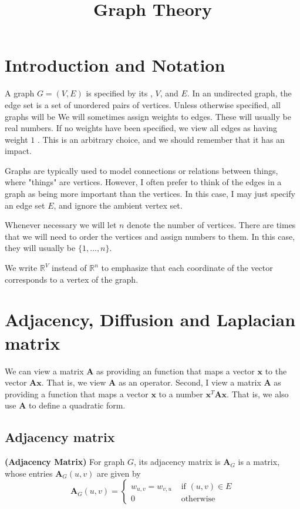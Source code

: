 \documentclass{article}
\title{Graph Theory}
\newcommand{\bfs}[1]{\textbf{({#1}) }}
\begin{document}
\maketitle

\section{Introduction and Notation}
A graph $G=(V, E)$ is specified by its , $V$, and  $E .$ In an undirected graph, the edge set is a set of unordered pairs of vertices. Unless otherwise specified, all graphs will be  We will sometimes assign weights to edges. These will usually be real numbers. If no weights have been specified, we view all edges as having weight $1$ . This is an arbitrary choice, and we should remember that it has an impact.

Graphs are typically used to model connections or relations between things, where "things" are vertices. However, I often prefer to think of the edges in a graph as being more important than the vertices. In this case, I may just specify an edge set $E$, and ignore the ambient vertex set.

Whenever necessary we will let $n$ denote the number of vertices. There are times that we will need to order the vertices and assign numbers to them. In this case, they will usually be $\{1, \ldots, n\}$. 

We write $\mathbb{R}^{V}$ instead of $\mathbb{R}^{n}$ to emphasize that each coordinate of the vector corresponds to a vertex of the graph.

\section{Adjacency, Diffusion and Laplacian matrix}
We can view a matrix $\boldsymbol{A}$ as providing an function that maps a vector $\boldsymbol{x}$ to the vector $\boldsymbol{A} \boldsymbol{x}$. That is, we view $\boldsymbol{A}$ as an operator. Second, I view a matrix $\boldsymbol{A}$ as providing a function that maps a vector $\boldsymbol{x}$ to a number $\boldsymbol{x}^{T} \boldsymbol{A} \boldsymbol{x} .$ That is, we also use $\boldsymbol{A}$ to define a quadratic form.
\subsection{Adjacency matrix}

\begin{defa}{\bfs{Adjacency Matrix}}
For graph $G$, its adjacency matrix is $\boldsymbol{A}_{G}$ is a  matrix, whose entries $\boldsymbol{A}_{G}(u, v)$ are given by
$$
\boldsymbol{A}_{G}(u, v)=\left\{\begin{array}{ll}
w_{u, v} = w_{v, u} & \text { if }(u, v) \in E \\
0 & \text { otherwise }
\end{array}\right.
$$
\end{defa}
\end{document}
